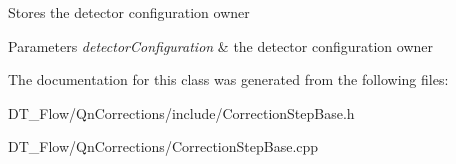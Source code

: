 Stores the detector configuration owner 
\begin{DoxyParams}{Parameters}
{\em detector\+Configuration} & the detector configuration owner \\
\hline
\end{DoxyParams}


The documentation for this class was generated from the following files\+:\begin{DoxyCompactItemize}
\item 
D\+T\+\_\+\+Flow/\+Qn\+Corrections/include/Correction\+Step\+Base.\+h\item 
D\+T\+\_\+\+Flow/\+Qn\+Corrections/Correction\+Step\+Base.\+cpp\end{DoxyCompactItemize}
